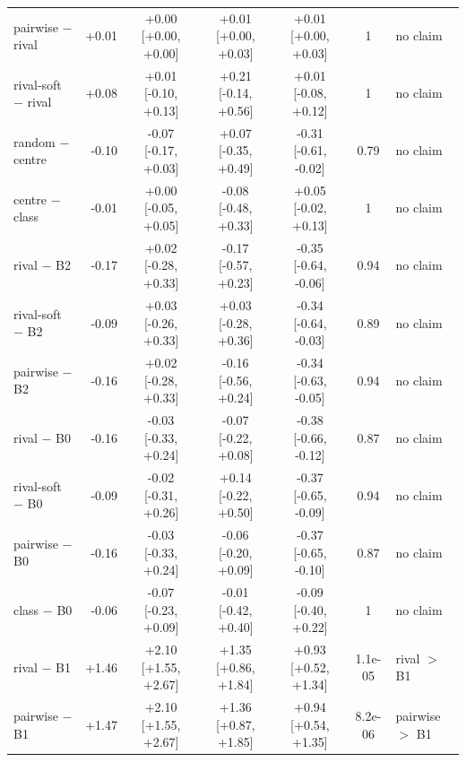 \begin{tabular}{lrccccl}
pairwise $-$ rival & +0.01 & +0.00 [+0.00, +0.00] & +0.01 [+0.00, +0.03] & +0.01 [+0.00, +0.03] & 1 & no claim \\
rival-soft $-$ rival & +0.08 & +0.01 [-0.10, +0.13] & +0.21 [-0.14, +0.56] & +0.01 [-0.08, +0.12] & 1 & no claim \\
random $-$ centre & -0.10 & -0.07 [-0.17, +0.03] & +0.07 [-0.35, +0.49] & -0.31 [-0.61, -0.02] & 0.79 & no claim \\
centre $-$ class & -0.01 & +0.00 [-0.05, +0.05] & -0.08 [-0.48, +0.33] & +0.05 [-0.02, +0.13] & 1 & no claim \\
rival $-$ B2 & -0.17 & +0.02 [-0.28, +0.33] & -0.17 [-0.57, +0.23] & -0.35 [-0.64, -0.06] & 0.94 & no claim \\
rival-soft $-$ B2 & -0.09 & +0.03 [-0.26, +0.33] & +0.03 [-0.28, +0.36] & -0.34 [-0.64, -0.03] & 0.89 & no claim \\
pairwise $-$ B2 & -0.16 & +0.02 [-0.28, +0.33] & -0.16 [-0.56, +0.24] & -0.34 [-0.63, -0.05] & 0.94 & no claim \\
rival $-$ B0 & -0.16 & -0.03 [-0.33, +0.24] & -0.07 [-0.22, +0.08] & -0.38 [-0.66, -0.12] & 0.87 & no claim \\
rival-soft $-$ B0 & -0.09 & -0.02 [-0.31, +0.26] & +0.14 [-0.22, +0.50] & -0.37 [-0.65, -0.09] & 0.94 & no claim \\
pairwise $-$ B0 & -0.16 & -0.03 [-0.33, +0.24] & -0.06 [-0.20, +0.09] & -0.37 [-0.65, -0.10] & 0.87 & no claim \\
class $-$ B0 & -0.06 & -0.07 [-0.23, +0.09] & -0.01 [-0.42, +0.40] & -0.09 [-0.40, +0.22] & 1 & no claim \\
rival $-$ B1 & +1.46 & +2.10 [+1.55, +2.67] & +1.35 [+0.86, +1.84] & +0.93 [+0.52, +1.34] & 1.1e-05 & rival $>$ B1 \\
pairwise $-$ B1 & +1.47 & +2.10 [+1.55, +2.67] & +1.36 [+0.87, +1.85] & +0.94 [+0.54, +1.35] & 8.2e-06 & pairwise $>$ B1 \\
\bottomrule
\end{tabular}
